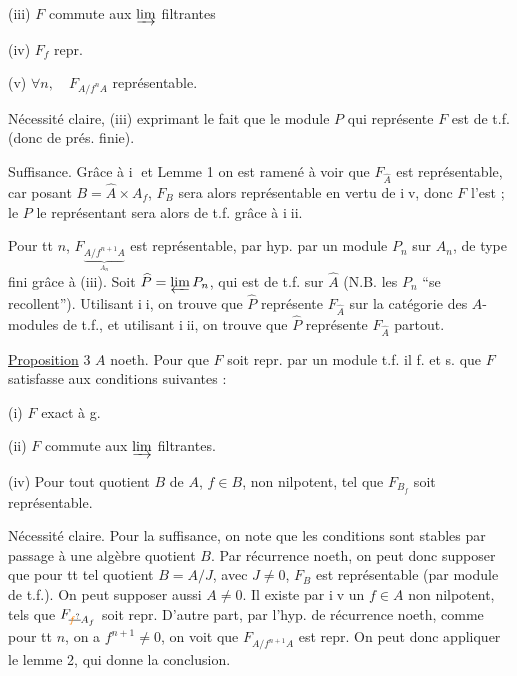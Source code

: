 (iii) $F$ commute aux $\varinjlim$ filtrantes

(iv) $F_f$ repr. 

(v) $\forall n,\quad F_{A/f^nA}$ représentable.

Nécessité claire, (iii) exprimant le fait que le module $P$ qui représente $F$ est de t.f. (donc de prés. finie).

Suffisance. Grâce à \textcircled{\scriptsize i} et Lemme 1 on est ramené à voir que $F_{\widehat A}$ est représentable, car posant $B=\widehat A\times A_f$, $F_B$ sera alors représentable en vertu de \textcircled{\scriptsize iv}, donc $F$ l'est ; le $P$ le représentant sera alors de t.f. grâce à \textcircled{\scriptsize iii}.

Pour tt $n$, $F_{\underbrace{A/f^{n+1}A}_{A_n}}$ est représentable, par hyp.  par un module $P_n$ sur $A_n$,  de type fini grâce à (iii). Soit $\widehat P=\varprojlim P_n$, qui est de t.f. sur $\widehat A$ (N.B. les $P_n$ ``se recollent'').  Utilisant \textcircled{\scriptsize ii}, on trouve que $\widehat P$ représente $F_{\widehat A}$ sur la catégorie des $A$-modules de t.f., et utilisant \textcircled{\scriptsize iii}, on trouve que $\widehat P$ représente $F_{\widehat A}$ partout.

\uline{Proposition} 3 \quad $A$ noeth. Pour que $F$ soit repr. par un module  t.f. il f. et s. que $F$ satisfasse aux conditions suivantes :

(i) $F$ exact à g.

(ii) $F$ commute aux $\varinjlim$ filtrantes.


(iv) Pour tout quotient  $B$ de $A$,   $f\in B$, non nilpotent, tel que $F_{B_f}$ soit représentable.

Nécessité claire. Pour la suffisance, on note que les conditions sont stables par passage à une algèbre quotient $B$. Par récurrence noeth, on peut donc supposer que pour tt tel quotient $B=A/J$, avec $J\ne0$, $F_B$ est représentable (par module de t.f.). On peut supposer aussi $A\ne0$. Il existe par \textcircled{\scriptsize iv} un $f\in A$ non nilpotent, tels que $F_{\deleted{\unsure{f}}A_f}$ soit repr. D'autre part, par l'hyp. de récurrence noeth, comme pour tt $n$, on a $f^{n+1}\ne0$, on voit que $F_{A/f^{n+1}A}$ est repr. On peut donc appliquer le lemme 2, qui donne la conclusion.

